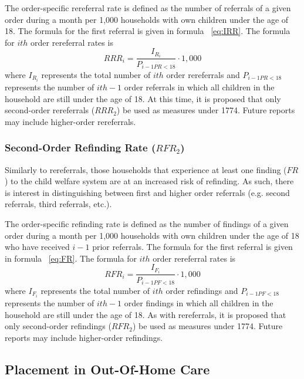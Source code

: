 \documentclass[12pt]{article}\usepackage[]{graphicx}\usepackage[]{color}
\begin{document}
The order-specific rereferral rate is defined as the number of referrals of a given order during a month per 1,000 households with own children under the age of 18. The formula for the first referral is given in formula ~\ref{eq:IRR}. The formula for $ith$ order rereferral rates is 
\begin{equation}\label{eq:RRRi}
RRR_i = \frac{I_{R_i}}{P_{i-1PR<18}} \cdot 1,000
\end{equation}
where $I_{R_i}$ represents the total number of $ith$ order rereferrals and $P_{i-1PR<18}$ represents the number of $ith-1$ order referrals in which all children in the household are still under the age of 18. At this time, it is proposed that only second-order rereferrals ($RRR_2$) be used as measures under 1774. Future reports may include higher-order rereferrals. 

\subsubsection{Second-Order Refinding Rate ($RFR_2$)}

Similarly to rereferrals, those households that experience at least one finding ($FR$) to the child welfare system are at an increased risk of refinding. As such, there is interest in distinguishing between first and higher order referrals (e.g. second referrals, third referrals, etc.). 

The order-specific refinding rate is defined as the number of findings of a given order during a month per 1,000 households with own children under the age of 18 who have received $i-1$ prior referrals. The formula for the first referral is given in formula ~\ref{eq:FR}. The formula for $ith$ order rereferral rates is 
\begin{equation}\label{eq:RRRi}
RFR_i = \frac{I_{F_i}}{P_{i-1PF<18}} \cdot 1,000
\end{equation}
where $I_{F_i}$ represents the total number of $ith$ order refindings and $P_{i-1PF<18}$ represents the number of $ith-1$ order findings in which all children in the household are still under the age of 18. As with rereferrals, it is proposed that only second-order refindings ($RFR_2$) be used as measures under 1774. Future reports may include higher-order refindings. 

\subsection{Placement in Out-Of-Home Care}
\end{document}
